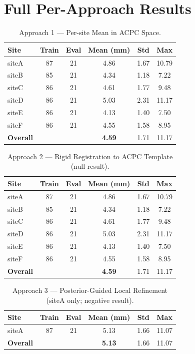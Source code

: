 \documentclass[11pt,letterpaper]{article}
\begin{document}
\newpage
\section{Full Per-Approach Results}
\label{app:results}

\begin{table}[h]
\centering
\caption{Approach 1 — Per-site Mean in ACPC Space.}
\small
\begin{tabular}{lccccc}
\toprule
\textbf{Site} & \textbf{Train} & \textbf{Eval} & \textbf{Mean (mm)} & \textbf{Std} & \textbf{Max} \\
\midrule
siteA & 87 & 21 & 4.86 & 1.67 & 10.79 \\
siteB & 85 & 21 & 4.34 & 1.18 & 7.22 \\
siteC & 86 & 21 & 4.61 & 1.77 & 9.48 \\
siteD & 86 & 21 & 5.03 & 2.31 & 11.17 \\
siteE & 86 & 21 & 4.13 & 1.40 & 7.50 \\
siteF & 86 & 21 & 4.55 & 1.58 & 8.95 \\
\textbf{Overall} & & & \textbf{4.59} & 1.71 & 11.17 \\
\bottomrule
\end{tabular}
\end{table}

\begin{table}[h]
\centering
\caption{Approach 2 — Rigid Registration to ACPC Template (null result).}
\small
\begin{tabular}{lccccc}
\toprule
\textbf{Site} & \textbf{Train} & \textbf{Eval} & \textbf{Mean (mm)} & \textbf{Std} & \textbf{Max} \\
\midrule
siteA & 87 & 21 & 4.86 & 1.67 & 10.79 \\
siteB & 85 & 21 & 4.34 & 1.18 & 7.22 \\
siteC & 86 & 21 & 4.61 & 1.77 & 9.48 \\
siteD & 86 & 21 & 5.03 & 2.31 & 11.17 \\
siteE & 86 & 21 & 4.13 & 1.40 & 7.50 \\
siteF & 86 & 21 & 4.55 & 1.58 & 8.95 \\
\textbf{Overall} & & & \textbf{4.59} & 1.71 & 11.17 \\
\bottomrule
\end{tabular}
\end{table}

\begin{table}[h]
\centering
\caption{Approach 3 — Posterior-Guided Local Refinement (siteA only; negative result).}
\small
\begin{tabular}{lccccc}
\toprule
\textbf{Site} & \textbf{Train} & \textbf{Eval} & \textbf{Mean (mm)} & \textbf{Std} & \textbf{Max} \\
\midrule
siteA & 87 & 21 & 5.13 & 1.66 & 11.07 \\
\textbf{Overall} & & & \textbf{5.13} & 1.66 & 11.07 \\
\bottomrule
\end{tabular}
\end{table}
\end{document}
